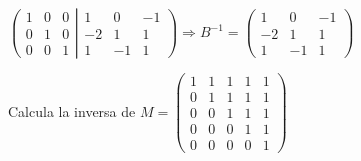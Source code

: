 \begin{proofw}
$\left( \begin{matrix} 1&0&0\\0&1&0\\0&0&1   \end{matrix} \right|
\left. \begin{matrix} 1&0&-1\\-2&1&1\\1&-1&1   \end{matrix} \right) \Rightarrow 
B^{-1}=\left( \begin{matrix} 1&0&-1\\-2&1&1\\1&-1&1   \end{matrix} \right)$

\end{proofw}


\begin{ejre}
Calcula la inversa de $M=\left( \begin{array}{ccccc}
 1&1&1&1&1\\0&1&1&1&1\\0&0&1&1&1\\0&0&0&1&1\\0&0&0&0&1	
 \end{array} \right)$
\end{ejre}

